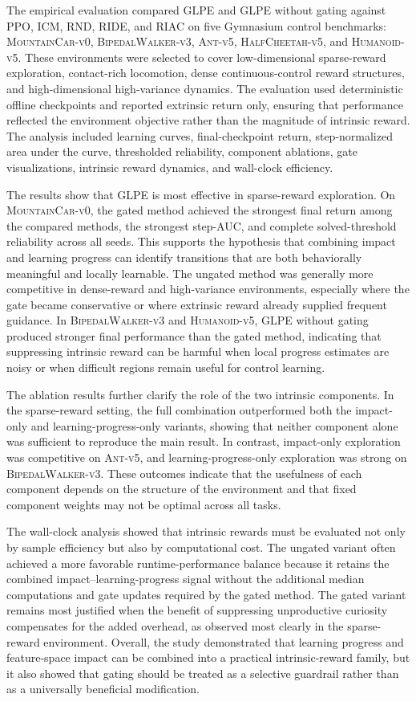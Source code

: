 The empirical evaluation compared GLPE and GLPE without gating against PPO, ICM, RND, RIDE, and RIAC on five Gymnasium control benchmarks: \textsc{MountainCar-v0}, \textsc{BipedalWalker-v3}, \textsc{Ant-v5}, \textsc{HalfCheetah-v5}, and \textsc{Humanoid-v5}.
These environments were selected to cover low-dimensional sparse-reward exploration, contact-rich locomotion, dense continuous-control reward structures, and high-dimensional high-variance dynamics.
The evaluation used deterministic offline checkpoints and reported extrinsic return only, ensuring that performance reflected the environment objective rather than the magnitude of intrinsic reward.
The analysis included learning curves, final-checkpoint return, step-normalized area under the curve, thresholded reliability, component ablations, gate visualizations, intrinsic reward dynamics, and wall-clock efficiency.

The results show that GLPE is most effective in sparse-reward exploration.
On \textsc{MountainCar-v0}, the gated method achieved the strongest final return among the compared methods, the strongest step-AUC, and complete solved-threshold reliability across all seeds.
This supports the hypothesis that combining impact and learning progress can identify transitions that are both behaviorally meaningful and locally learnable.
The ungated method was generally more competitive in dense-reward and high-variance environments, especially where the gate became conservative or where extrinsic reward already supplied frequent guidance.
In \textsc{BipedalWalker-v3} and \textsc{Humanoid-v5}, GLPE without gating produced stronger final performance than the gated method, indicating that suppressing intrinsic reward can be harmful when local progress estimates are noisy or when difficult regions remain useful for control learning.

The ablation results further clarify the role of the two intrinsic components.
In the sparse-reward setting, the full combination outperformed both the impact-only and learning-progress-only variants, showing that neither component alone was sufficient to reproduce the main result.
In contrast, impact-only exploration was competitive on \textsc{Ant-v5}, and learning-progress-only exploration was strong on \textsc{BipedalWalker-v3}.
These outcomes indicate that the usefulness of each component depends on the structure of the environment and that fixed component weights may not be optimal across all tasks.

The wall-clock analysis showed that intrinsic rewards must be evaluated not only by sample efficiency but also by computational cost.
The ungated variant often achieved a more favorable runtime-performance balance because it retains the combined impact--learning-progress signal without the additional median computations and gate updates required by the gated method.
The gated variant remains most justified when the benefit of suppressing unproductive curiosity compensates for the added overhead, as observed most clearly in the sparse-reward environment.
Overall, the study demonstrated that learning progress and feature-space impact can be combined into a practical intrinsic-reward family, but it also showed that gating should be treated as a selective guardrail rather than as a universally beneficial modification.